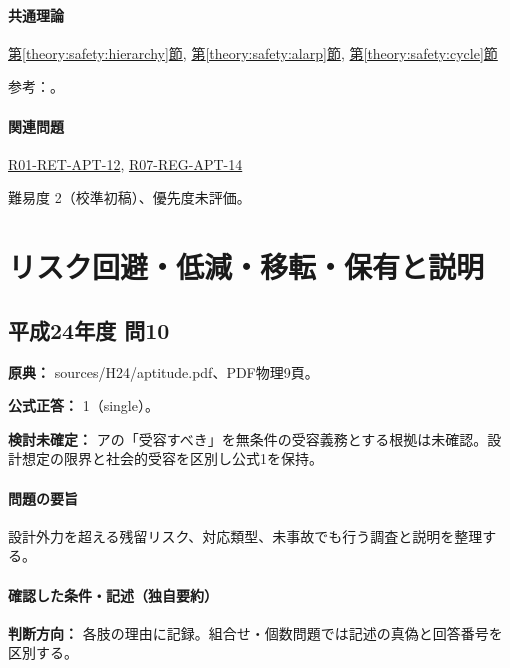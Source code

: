 \paragraph{共通理論} \hyperref[theory:safety:hierarchy]{第\ref*{theory:safety:hierarchy}節}, \hyperref[theory:safety:alarp]{第\ref*{theory:safety:alarp}節}, \hyperref[theory:safety:cycle]{第\ref*{theory:safety:cycle}節}

\par 参考：\cite{saf_ra2006,saf_parliament2006,saf_guide51}。

\paragraph{関連問題} \hyperref[q:r01-ret-apt-12]{R01-RET-APT-12}, \hyperref[q:r07-reg-apt-14]{R07-REG-APT-14}

\par 難易度 2（校準初稿）、優先度未評価。

\section{リスク回避・低減・移転・保有と説明}

\subsection{平成24年度 問10}
\label{q:h24-reg-apt-10}

\noindent\textbf{原典：} sources/H24/aptitude.pdf、PDF物理9頁。

\textbf{公式正答：} 1（single）。

\par\textbf{検討未確定：} アの「受容すべき」を無条件の受容義務とする根拠は未確認。設計想定の限界と社会的受容を区別し公式1を保持。

\paragraph{問題の要旨} 設計外力を超える残留リスク、対応類型、未事故でも行う調査と説明を整理する。

\paragraph{確認した条件・記述（独自要約）}\mbox{}\par

\noindent\textbf{判断方向：} 各肢の理由に記録。組合せ・個数問題では記述の真偽と回答番号を区別する。\par

